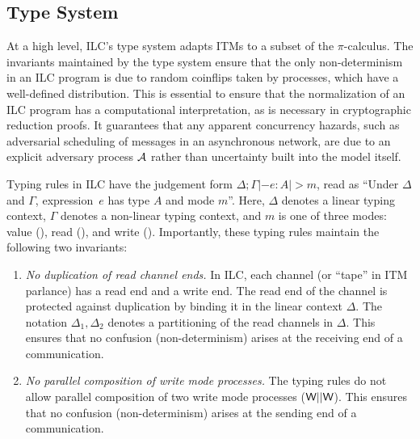 

\subsection{Type System}
\label{subsec:types}







At a high level, ILC's type system adapts ITMs to a subset of the $\pi$-calculus.
The invariants maintained by the type system ensure that the only
non-determinism in an ILC program is due to random coinflips taken by processes,
which have a well-defined distribution. This is essential to ensure that the
normalization of an ILC program has a computational interpretation, as is
necessary in cryptographic reduction proofs. It guarantees that any apparent
concurrency hazards, such as adversarial scheduling of messages in an
asynchronous network, are due to an explicit adversary process $\mathcal{{A}}$ rather
than uncertainty built into the model itself.

Typing rules in ILC have the judgement form $\Delta ; \Gamma |- e : A |> m$, read as
``Under $\Delta$ and $\Gamma$, expression~$e$ has type $A$ and mode $m$''.  Here, $\Delta$
denotes a linear typing context, $\Gamma$ denotes a non-linear typing context, and
$m$ is one of three modes: value (\Vm), read (\Rm), and write
(\Wm). Importantly, these typing rules maintain the following two invariants:

\begin{enumerate}
\item \emph{No duplication of read channel ends.} In ILC, each channel (or
  ``tape'' in ITM parlance) has a read end and a write end. The read end of the
  channel is protected against duplication by binding it in the linear context
  $\Delta$. The notation $\Delta_1, \Delta_2$ denotes a partitioning of the read channels in
  $\Delta$. This ensures that no confusion (non-determinism) arises at the receiving
  end of a communication.

\item \emph{No parallel composition of write mode processes.} The typing rules
  do not allow parallel composition of two write mode processes ($\textsf{W} ||
  \textsf{W}$). This ensures that no confusion (non-determinism) arises at the sending
  end of a communication.

\end{enumerate}


